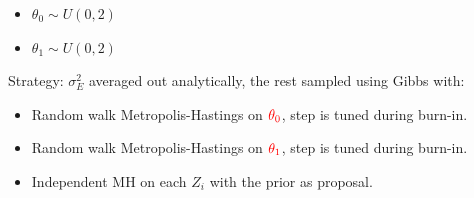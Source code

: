 \documentclass{beamer}
\begin{document}
\begin{frame}
\begin{minipage}{\textwidth}
\begin{minipage}{0.45\textwidth}
\begin{itemize}
        \end{itemize}
        \end{minipage}
        \begin{minipage}{0.45\textwidth}
            \begin{itemize}
                \item $\theta_0 \sim U(0,2)$
                \item $\theta_1 \sim U(0,2)$
            \end{itemize}
        \end{minipage}
	\end{minipage}
    \vspace{0.5cm}

Strategy: $\sigma_E^2$ averaged out analytically, the rest sampled using Gibbs with:
\begin{itemize}
    \item Random walk Metropolis-Hastings on $\textcolor{red}{\theta_0}$, step is tuned during burn-in.
    \item Random walk Metropolis-Hastings on $\textcolor{red}{\theta_1}$, step is tuned during burn-in.
    \item Independent MH on each $Z_i$ with the prior as proposal.
\end{itemize}

	\vspace{1cm}
	 

\end{frame}
\end{document}
